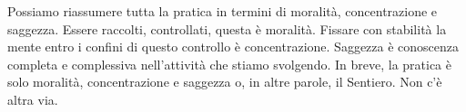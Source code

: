 Possiamo riassumere tutta la pratica in termini di moralità,
concentrazione e saggezza. Essere raccolti, controllati, questa è
moralità. Fissare con stabilità la mente entro i confini di questo
controllo è concentrazione. Saggezza è conoscenza completa e complessiva
nell'attività che stiamo svolgendo. In breve, la pratica è solo
moralità, concentrazione e saggezza o, in altre parole, il Sentiero. Non
c'è altra via.

